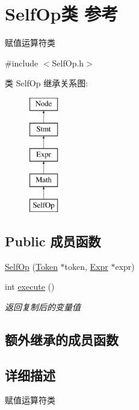 \hypertarget{class_self_op}{}\section{Self\+Op类 参考}
\label{class_self_op}


赋值运算符类  




{\ttfamily \#include $<$Self\+Op.\+h$>$}

类 Self\+Op 继承关系图\+:\begin{figure}[H]
\begin{center}
\leavevmode
\includegraphics[height=5.000000cm]{class_self_op}
\end{center}
\end{figure}
\subsection*{Public 成员函数}
\begin{DoxyCompactItemize}
\item 
\hyperlink{class_self_op_a5292e81fca1817185db15b29564a32ee}{Self\+Op} (\hyperlink{class_token}{Token} $\ast$token, \hyperlink{class_expr}{Expr} $\ast$expr)
\item 
\mbox{\label{class_self_op_ab452bcad1cd4f1286813b1f737583818}} 
int \hyperlink{class_self_op_ab452bcad1cd4f1286813b1f737583818}{execute} ()
\begin{DoxyCompactList}\small\item\em 返回复制后的变量值 \end{DoxyCompactList}\end{DoxyCompactItemize}
\subsection*{额外继承的成员函数}


\subsection{详细描述}
赋值运算符类 

